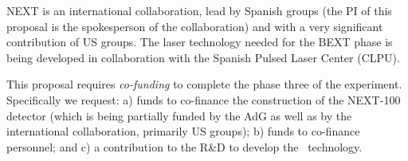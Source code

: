 NEXT is an international collaboration, lead by Spanish groups (the PI of this proposal is the spokesperson of the collaboration) and with a very significant contribution of US groups. The laser technology needed for the BEXT phase is being developed in collaboration with the Spanish Pulsed Laser Center (CLPU). 

 This proposal requires {\em co-funding} to complete the phase three of the experiment. Specifically we request: a) funds to co-finance the construction of the NEXT-100 detector (which is being partially funded by the AdG as well as by the international collaboration, primarily US groups); b) funds to co-finance personnel; and c) a  contribution to the R\&D to develop the \BATA\ technology.   

